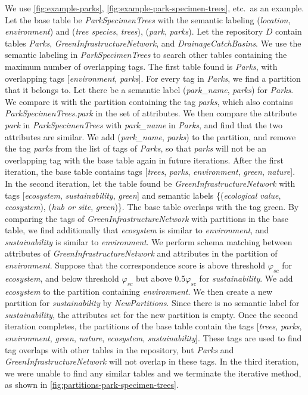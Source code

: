 We use \autoref{fig:example-parks}, \autoref{fig:example-park-specimen-trees}, etc.~as an example. Let the base table be \textit{ParkSpecimenTrees} with the semantic labeling (\textit{location}, \textit{environment}) and (\textit{tree species}, \textit{trees}), (\textit{park}, \textit{parks}). Let the repository $D$ contain tables \textit{Parks}, \textit{GreenInfrastructureNetwork}, and \textit{DrainageCatchBasins}. We use the semantic labeling in \textit{ParkSpecimenTrees} to search other tables containing the maximum number of overlapping tags. The first table found is \textit{Parks}, with overlapping tags [\textit{environment}, \textit{parks}]. For every tag in \textit{Parks}, we find a partition that it belongs to. Let there be a semantic label (\textit{park\_name}, \textit{parks}) for \textit{Parks}. We compare it with the partition containing the tag \textit{parks}, which also contains \textit{ParkSpecimenTrees.park} in the set of attributes. We then compare the attribute \textit{park} in \textit{ParkSpecimenTrees} with \textit{park\_name} in \textit{Parks}, and find that the two attributes are similar. We add (\textit{park\_name}, \textit{parks}) to the partition, and remove the tag \textit{parks} from the list of tags of \textit{Parks}, so that \textit{parks} will not be an overlapping tag with the base table again in future iterations. After the first iteration, the base table contains tags [\textit{trees}, \textit{parks}, \textit{environment}, \textit{green}, \textit{nature}]. In the second iteration, let the table found be \textit{GreenInfrastructureNetwork} with tags [\textit{ecosystem}, \textit{sustainability}, \textit{green}] and semantic labels \{(\textit{ecological value}, \textit{ecosystem}), (\textit{hub or site}, \textit{green})\}. The base table overlaps with the tag green. By comparing the tags of \textit{GreenInfrastructureNetwork} with partitions in the base table, we find additionally that \textit{ecosystem} is similar to \textit{environment}, and \textit{sustainability} is similar to \textit{environment}. We perform schema matching between attributes of \textit{GreenInfrastructureNetwork} and attributes in the partition of \textit{environment}. Suppose that the correspondence score is above threshold $\ensuremath{\varphi}_{sc}$ for \textit{ecosystem}, and below threshold $\ensuremath{\varphi}_{sc}$ but above 0.5$\ensuremath{\varphi}_{sc}$ for \textit{sustainability}. We add \textit{ecosystem} to the partition containing \textit{environment}. We then create a new partition for \textit{sustainability} by \textit{NewPartitions}. Since there is no semantic label for \textit{sustainability}, the attributes set for the new partition is empty. Once the second iteration completes, the partitions of the base table contain the tags [\textit{trees}, \textit{parks}, \textit{environment}, \textit{green}, \textit{nature}, \textit{ecosystem}, \textit{sustainability}]. These tags are used to find tag overlaps with other tables in the repository, but \textit{Parks} and \textit{GreenInfrastructureNetwork} will not overlap in these tags. In the third iteration, we were unable to find any similar tables and we terminate the iterative method, as shown in \autoref{fig:partitions-park-specimen-trees}.

